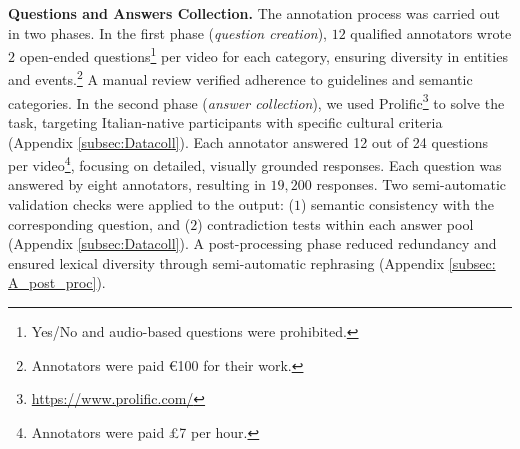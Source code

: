 \textbf{Questions and Answers Collection.} The annotation process was carried out in two phases.
In the first phase (\emph{question creation}), $12$ qualified annotators wrote $2$ open-ended questions\footnote{Yes/No and audio-based questions were prohibited.} per video for each category, ensuring diversity in entities and events.\footnote{Annotators were paid €100 for their work.} %
A manual review verified adherence to guidelines and semantic categories.
In the second phase (\emph{answer collection}), we used Prolific\footnote{\url{https://www.prolific.com/}} to solve the task, targeting Italian-native participants with specific cultural criteria (Appendix \ref{subsec:Datacoll}). Each annotator answered 12 out of 24 questions per video\footnote{Annotators were paid £7 per hour.}, focusing on detailed, visually grounded responses. Each question was answered by eight annotators, resulting in $19,200$ responses. 
Two semi-automatic validation checks were applied to the output: ($1$) semantic consistency with the corresponding question, and ($2$) contradiction tests within each answer pool (Appendix \ref{subsec:Datacoll}). A post-processing phase reduced redundancy and ensured lexical diversity through semi-automatic rephrasing (Appendix \ref{subsec: A_post_proc}).

